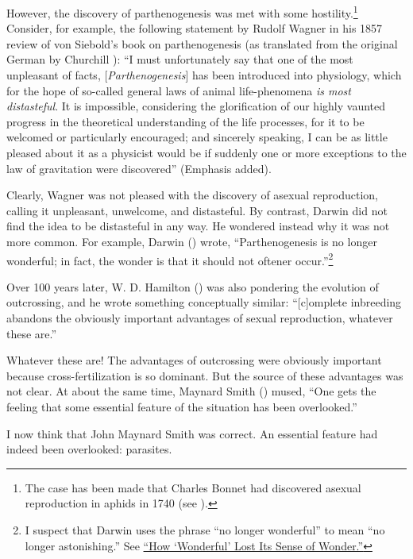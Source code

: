 \documentclass[
  letterpaper,
]{book}
\begin{document}
However, the discovery of parthenogenesis was met with some
hostility.\footnote{The case has been made that Charles Bonnet had
  discovered asexual reproduction in aphids in 1740 (see
  ).} Consider, for example,
the following statement by Rudolf Wagner in his 1857 review of von
Siebold's book on parthenogenesis (as translated from the original
German by Churchill ): ``I must
unfortunately say that one of the most unpleasant of facts,
{[}\emph{Parthenogenesis}{]} has been introduced into physiology, which
for the hope of so-called general laws of animal life-phenomena \emph{is
most distasteful}. It is impossible, considering the glorification of
our highly vaunted progress in the theoretical understanding of the life
processes, for it to be welcomed or particularly encouraged; and
sincerely speaking, I can be as little pleased about it as a physicist
would be if suddenly one or more exceptions to the law of gravitation
were discovered'' (Emphasis added).

Clearly, Wagner was not pleased with the discovery of asexual
reproduction, calling it unpleasant, unwelcome, and distasteful. By
contrast, Darwin did not find the idea to be distasteful in any way. He
wondered instead why it was not more common. For example, Darwin
() wrote, ``Parthenogenesis is no longer
wonderful; in fact, the wonder is that it should not oftener
occur.''\footnote{I suspect that Darwin uses the phrase ``no longer
  wonderful'' to mean ``no longer astonishing.'' See
  \href{https://www.merriam-webster.com/words-at-play/wonderful-word-history-evolution}{``How
  `Wonderful' Lost Its Sense of Wonder.''}}

Over 100 years later, W. D. Hamilton
() was also pondering the evolution of
outcrossing, and he wrote something conceptually similar:
``{[}c{]}omplete inbreeding abandons the obviously important advantages
of sexual reproduction, whatever these are.''

Whatever these are! The advantages of outcrossing were obviously
important because cross-fertilization is so dominant. But the source of
these advantages was not clear. At about the same time, Maynard Smith
() mused, ``One gets the feeling that
some essential feature of the situation has been overlooked.''

I now think that John Maynard Smith was correct. An essential feature
had indeed been overlooked: parasites.
\end{document}
